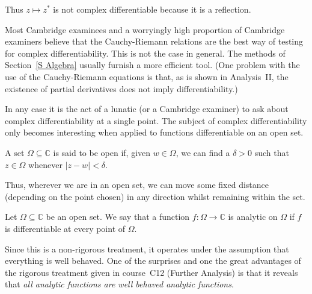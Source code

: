 Thus $z\mapsto z^{*}$ is not complex differentiable
because it is a reflection.

Most Cambridge examinees and a worryingly high proportion
of Cambridge examiners believe that the Cauchy-Riemann
relations are the best way of testing for complex 
differentiability. This is not the case in general.
The methods of Section~\ref{S Algebra} usually
furnish a more efficient tool. (One problem with
the use of the Cauchy-Riemann equations is that,
as is shown in Analysis~II, the existence of partial
derivatives does not imply differentiability.)

In any case it is the act of a lunatic (or a Cambridge
examiner) to ask about complex differentiability
at a single point. The subject of complex differentiability
only becomes interesting when applied to functions
differentiable on an open set.
\begin{definition} A set $\Omega\subseteq{\mathbb C}$
is said to be open if, given $w\in\Omega$, we can find a $\delta>0$
such that $z\in\Omega$ whenever $|z-w|<\delta$.
\end{definition}
Thus, wherever we are in an open set, we can move some
fixed distance (depending on the point chosen)
in any direction whilst remaining within
the set.
\begin{definition} Let $\Omega\subseteq{\mathbb C}$
be an open set. We say that a function $f:\Omega\rightarrow{\mathbb C}$
is analytic on $\Omega$ if $f$ is differentiable at
every point of $\Omega$.
\end{definition}

Since this is a non-rigorous treatment, it operates under
the assumption that everything is well behaved. One of the
surprises and one the great advantages of the rigorous
treatment given in course~C12 (Further Analysis) is that
it reveals that \emph{all analytic functions are well behaved
analytic functions}.

